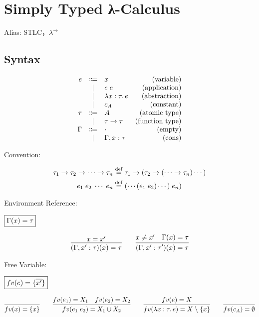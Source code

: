 \section{Simply Typed λ-Calculus}

Alias: STLC，$\lambda^{\to}$ \cite{Girard:1989}

\subsection{Syntax}

\begin{align*}
  \begin{array}{rclr}
  e
  & \Coloneq & x &(\text{variable}) \\
  & \mid & e\; e &(\text{application}) \\
  & \mid & \lambda x: \tau\ldotp e &(\text{abstraction}) \\
  & \mid & c_A &(\text{constant}) \\
  \tau
  & \Coloneq & A &(\text{atomic type}) \\
  & \mid & \tau \to \tau &(\text{function type}) \\
  \Gamma
  & \Coloneq & \cdot &(\text{empty}) \\
  & \mid & \Gamma, x: \tau &(\text{cons})
  \end{array}
\end{align*}

Convention:

\begin{align*}
  \tau_1 \to \tau_2 \to \cdots \to \tau_n &\mathrel{\overset{\mathrm{def}}{=}} \tau_1 \to (\tau_2 \to (\cdots \to \tau_n) \cdots ) \\
  e_1\; e_2\; \cdots \; e_n &\mathrel{\overset{\mathrm{def}}{=}} (\cdots(e_1\; e_2)\cdots)\; e_n)
\end{align*}

Environment Reference:

$\fbox{$\Gamma(x) = \tau$}$

\begin{gather*}
  \infer{(\Gamma, x': \tau)(x) = \tau}{
    x = x'
  }
  \hspace{2em}
  \infer{(\Gamma, x': \tau')(x) = \tau}{
    x \neq x'
    &
    \Gamma(x) = \tau
  }
\end{gather*}

Free Variable:

$\fbox{$\mathop{fv}(e) = \{\overline{x'}\}$}$

\begin{gather*}
  \infer{\freevar(x) = \{x\}}{}
  \hspace{2em}
  \infer{\freevar(e_1\; e_2) = X_1 \cup X_2}{
    \freevar(e_1) = X_1
    &
    \freevar(e_2) = X_2
  }
  \hspace{2em}
  \infer{\freevar(\lambda x: \tau\ldotp e) = X \rcomplement \{x\}}{
    \freevar(e) = X
  }
  \hspace{2em}
  \infer{\freevar(c_A) = \emptyset}{}
\end{gather*}

